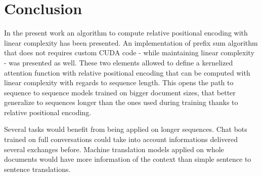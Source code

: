 \section{Conclusion}

In the present work an algorithm to compute
\citet{shaw2018selfattention} relative
positional encoding with linear complexity has been presented. An implementation of \citet{choromanski2021rethinking} prefix sum algorithm that does not requires custom CUDA code - while maintaining linear complexity - was presented as well. These two elements allowed to define a kernelized attention function with relative positional encoding that can be computed with linear complexity with regards to sequence length. This opens the path to sequence to sequence models trained on bigger document sizes, that better generalize to sequences longer than the ones used during training thanks to relative positional encoding.

Several tasks would benefit from being applied on longer sequences. Chat bots trained on full conversations could take into account informations delivered several exchanges before. Machine translation models applied on whole documents would have more information of the context than simple sentence to sentence translations.

\endinput
